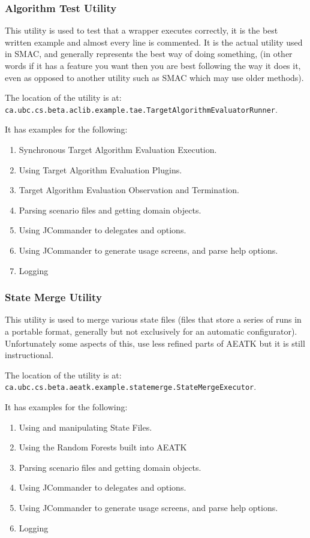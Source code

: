 \documentclass[11pt,letterpaper,oneside]{article}
\begin{document}
\subsubsection{Algorithm Test Utility}

This utility is used to test that a wrapper executes correctly, it is the best written example and almost every line is commented. It is the actual utility used in SMAC, and generally represents the best way of doing something, (in other words if it has a feature you want then you are best following the way it does it, even as opposed to another utility such as SMAC which may use older methods).

The location of the utility is at:\\ \texttt{ca.ubc.cs.beta.aclib.example.tae.TargetAlgorithmEvaluatorRunner}.

It has examples for the following:

\begin{enumerate}
\item Synchronous Target Algorithm Evaluation Execution.
\item Using Target Algorithm Evaluation Plugins.
\item Target Algorithm Evaluation Observation and Termination.
\item Parsing scenario files and getting domain objects.
\item Using JCommander to delegates and options.
\item Using JCommander to generate usage screens, and parse help options.
\item Logging
\end{enumerate}

\subsubsection{State Merge Utility}

This utility is used to merge various state files (files that store a series of runs in a portable format, generally but not exclusively for an automatic configurator). Unfortunately some aspects of this, use less refined parts of AEATK but it is still instructional.


The location of the utility is at:\\ \texttt{ca.ubc.cs.beta.aeatk.example.statemerge.StateMergeExecutor}.

It has examples for the following:

\begin{enumerate}
\item Using and manipulating State Files.
\item Using the Random Forests built into AEATK
\item Parsing scenario files and getting domain objects.
\item Using JCommander to delegates and options.
\item Using JCommander to generate usage screens, and parse help options.
\item Logging
\end{enumerate}
\end{document}

